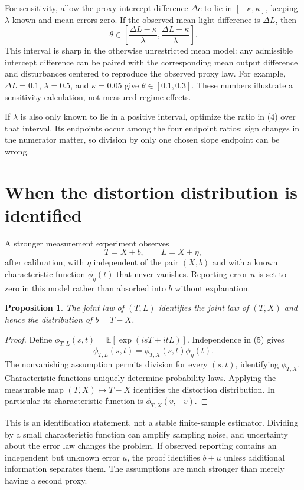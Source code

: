 \documentclass[11pt,a4paper]{article}
\newtheorem{proposition}[theorem]{Proposition}
\newcommand{\E}{\mathbb E}
\begin{document}
For sensitivity, allow the proxy intercept difference $\Delta c$ to lie in
$[-\kappa,\kappa]$, keeping $\lambda$ known and mean errors zero. If the observed mean light difference is $\Delta L$, then
\[
 \theta\in
 \left[\frac{\Delta L-\kappa}{\lambda},
       \frac{\Delta L+\kappa}{\lambda}\right].
 \tag{4}
\]
This interval is sharp in the otherwise unrestricted mean model: any admissible intercept difference can be paired with the corresponding mean output difference and disturbances centered to reproduce the observed proxy law. For example, $\Delta L=0.1$, $\lambda=0.5$, and $\kappa=0.05$ give $\theta\in[0.1,0.3]$. These numbers illustrate a sensitivity calculation, not measured regime effects.

If $\lambda$ is also only known to lie in a positive interval, optimize the ratio in (4) over that interval. Its endpoints occur among the four endpoint ratios; sign changes in the numerator matter, so division by only one chosen slope endpoint can be wrong.
\section{When the distortion distribution is identified}
A stronger measurement experiment observes
\[
 T=X+b,\qquad L=X+\eta,
 \tag{5}
\]
after calibration, with $\eta$ independent of the pair $(X,b)$ and with a known characteristic function $\phi_\eta(t)$ that never vanishes. Reporting error $u$ is set to zero in this model rather than absorbed into $b$ without explanation.

\begin{proposition}
The joint law of $(T,L)$ identifies the joint law of $(T,X)$ and hence the distribution of $b=T-X$.
\end{proposition}
\begin{proof}
Define $\phi_{T,L}(s,t)=\E[\exp(i sT+i tL)]$. Independence in (5) gives
\[
 \phi_{T,L}(s,t)=\phi_{T,X}(s,t)\phi_\eta(t).
\]
The nonvanishing assumption permits division for every $(s,t)$, identifying $\phi_{T,X}$. Characteristic functions uniquely determine probability laws. Applying the measurable map $(T,X)\mapsto T-X$ identifies the distortion distribution. In particular its characteristic function is $\phi_{T,X}(v,-v)$.
\end{proof}
This is an identification statement, not a stable finite-sample estimator. Dividing by a small characteristic function can amplify sampling noise, and uncertainty about the error law changes the problem. If observed reporting contains an independent but unknown error $u$, the proof identifies $b+u$ unless additional information separates them. The assumptions are much stronger than merely having a second proxy.
\end{document}
